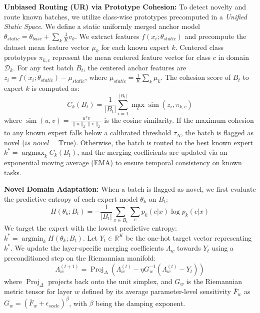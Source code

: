 \documentclass{article}
\theoremstyle{plain}
\theoremstyle{definition}
\theoremstyle{remark}
\begin{document}
\textbf{Unbiased Routing (UR) via Prototype Cohesion:} To detect novelty and route known batches, we utilize class-wise prototypes precomputed in a \textit{Unified Static Space}. We define a static uniformly merged anchor model $\theta_{static} = \theta_{base} + \sum_k \frac{1}{K} v_k$. We extract features $f(x_i; \theta_{static})$ and precompute the dataset mean feature vector $\mu_k$ for each known expert $k$. Centered class prototypes $\pi_{k,c}$ represent the mean centered feature vector for class $c$ in domain $\mathcal{D}_k$. For any test batch $B_t$, the centered anchor features are $z_i = f(x_i; \theta_{static}) - \mu_{static}$, where $\mu_{static} = \frac{1}{K} \sum_k \mu_k$. The cohesion score of $B_t$ to expert $k$ is computed as:
\begin{equation}
    C_k(B_t) = \frac{1}{|B_t|} \sum_{i=1}^{|B_t|} \max_{c} \operatorname{sim}(z_i, \pi_{k,c})
\end{equation}
where $\operatorname{sim}(u, v) = \frac{u^T v}{\|u\|_2 \|v\|_2}$ is the cosine similarity. If the maximum cohesion to any known expert falls below a calibrated threshold $\tau_N$, the batch is flagged as novel ($is\_novel = \text{True}$). Otherwise, the batch is routed to the best known expert $k^* = \operatorname{arg max}_k C_k(B_t)$, and the merging coefficients are updated via an exponential moving average (EMA) to ensure temporal consistency on known tasks.

\textbf{Novel Domain Adaptation:} When a batch is flagged as novel, we first evaluate the predictive entropy of each expert model $\theta_k$ on $B_t$:
\begin{equation}
    H(\theta_k; B_t) = -\frac{1}{|B_t|} \sum_{x \in B_t} \sum_{c} p_k(c|x) \log p_k(c|x)
\end{equation}
We target the expert with the lowest predictive entropy: $k^* = \operatorname{arg min}_k H(\theta_k; B_t)$. Let $Y_t \in \mathbb{R}^K$ be the one-hot target vector representing $k^*$. We update the layer-specific merging coefficients $\Lambda_w$ towards $Y_t$ using a preconditioned step on the Riemannian manifold:
\begin{equation}
    \Lambda_w^{(t+1)} = \operatorname{Proj}_{\Delta} \left( \Lambda_w^{(t)} - \eta G_w^{-1} (\Lambda_w^{(t)} - Y_t) \right)
\end{equation}
where $\operatorname{Proj}_{\Delta}$ projects back onto the unit simplex, and $G_w$ is the Riemannian metric tensor for layer $w$ defined by its average parameter-level sensitivity $\bar{F}_w$ as $G_w = (\bar{F}_w + \epsilon_{scale})^{\beta}$, with $\beta$ being the damping exponent.
\end{document}
